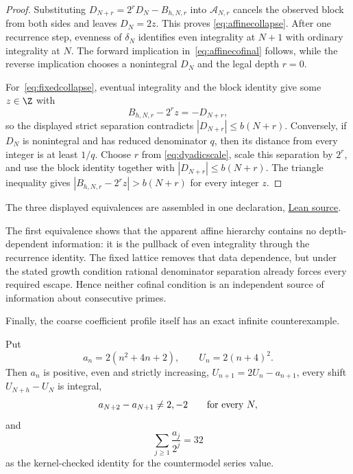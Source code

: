 \documentclass[11pt]{article}
\begin{document}
\begin{proof}
Substituting $D_{N+r}=2^rD_N-B_{h,N,r}$ into $\mathcal A_{N,r}$ cancels the
observed block from both sides and leaves $D_N=2z$.  This proves
\eqref{eq:affinecollapse}.  After one recurrence step, evenness of
$\delta_N$ identifies even integrality at $N+1$ with ordinary integrality at
$N$.  The forward implication in~\eqref{eq:affinecofinal} follows, while the
reverse implication chooses a nonintegral $D_N$ and the legal depth $r=0$.

For~\eqref{eq:fixedcollapse}, eventual integrality and the block identity give
some $z\in\Z$ with
\[
 B_{h,N,r}-2^rz=-D_{N+r},
\]
so the displayed strict separation contradicts $|D_{N+r}|\le b(N+r)$.
Conversely, if $D_N$ is nonintegral and has reduced denominator $q$, then its
distance from every integer is at least $1/q$.  Choose $r$ from
\eqref{eq:dyadicscale}, scale this separation by $2^r$, and use the block
identity together with $|D_{N+r}|\le b(N+r)$.  The triangle inequality gives
$|B_{h,N,r}-2^rz|>b(N+r)$ for every integer $z$.
\end{proof}

\noindent The three displayed equivalences are assembled in one declaration,
\href{https://github.com/wcook04/plectis-erdos/blob/f36a98bf3d3e6f65f1074e3b800e3293d5b8a51a/ErdosProblems/Erdos251/PaperCoreR7.lean#L241}{Lean source}.

The first equivalence shows that the apparent affine hierarchy contains no
depth-dependent information: it is the pullback of even integrality through
the recurrence identity.  The fixed lattice removes that data dependence, but
under the stated growth condition rational denominator separation already
forces every required escape.  Hence neither cofinal condition is an
independent source of information about consecutive primes.

Finally, the coarse coefficient profile itself has an exact infinite
counterexample.

\begin{proposition}\label{res:polynomialcountermodel}
Put
\[
 a_n=2(n^2+4n+2),\qquad U_n=2(n+4)^2.
\]
Then $a_n$ is positive, even and strictly increasing,
$U_{n+1}=2U_n-a_{n+1}$, every shift $U_{N+h}-U_N$ is integral,
\[
 a_{N+2}-a_{N+1}\ne2,-2
 \qquad\hbox{for every }N,
\]
and
\[
 \sum_{j\ge1}\frac{a_j}{2^j}=32
\]
as the kernel-checked identity for the countermodel series value.
\end{proposition}
\end{document}
